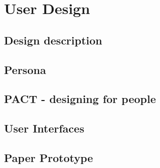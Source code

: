 \chapter{User Design}


\section{Design description}



\section{Persona}

\section{PACT - designing for people}


\section{User Interfaces}


\section{Paper Prototype}

